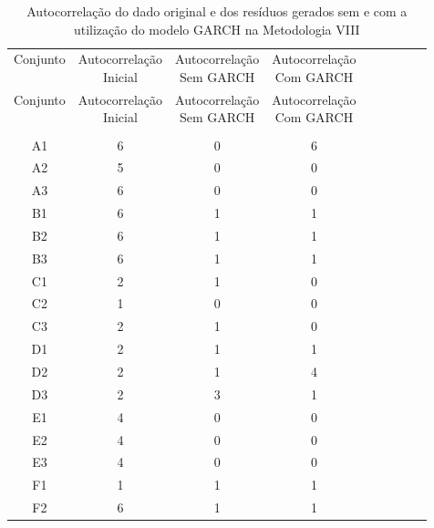 \begin{center}
\begin{longtable}{ccccc|cccc}
\toprule
\rowcolor{white}
\caption[Metodologia VIII: evolução da autocorrelação]{Autocorrelação do dado
original e dos resíduos gerados sem e com a utilização do modelo GARCH na
Metodologia VIII} \label{tab:EvolucaoAutocorrelacaoMet8}\\
\midrule
Conjunto & \specialcell{Autocorrelação\\Inicial} & \specialcell{Autocorrelação\\Sem
GARCH} & \specialcell{Autocorrelação\\Com GARCH} \\
\midrule
\endfirsthead 
\midrule
\rowcolor{white}
Conjunto & \specialcell{Autocorrelação\\Inicial} & \specialcell{Autocorrelação\\Sem
GARCH} & \specialcell{Autocorrelação\\Com GARCH} \\
\toprule
\endhead
\midrule \\ %
\endfoot
\bottomrule 
\endlastfoot
    A1    & 6     & 0     & 6 \\
    A2    & 5     & 0     & 0 \\
    A3    & 6     & 0     & 0 \\
    B1    & 6     & 1     & 1 \\
    B2    & 6     & 1     & 1 \\
    B3    & 6     & 1     & 1 \\
    C1    & 2     & 1     & 0 \\
    C2    & 1     & 0     & 0 \\
    C3    & 2     & 1     & 0 \\
    D1    & 2     & 1     & 1 \\
    D2    & 2     & 1     & 4 \\
    D3    & 2     & 3     & 1 \\
    E1    & 4     & 0     & 0 \\
    E2    & 4     & 0     & 0 \\
    E3    & 4     & 0     & 0 \\
    F1    & 1     & 1     & 1 \\
    F2    & 6     & 1     & 1 \\

\end{longtable}
\end{center}
